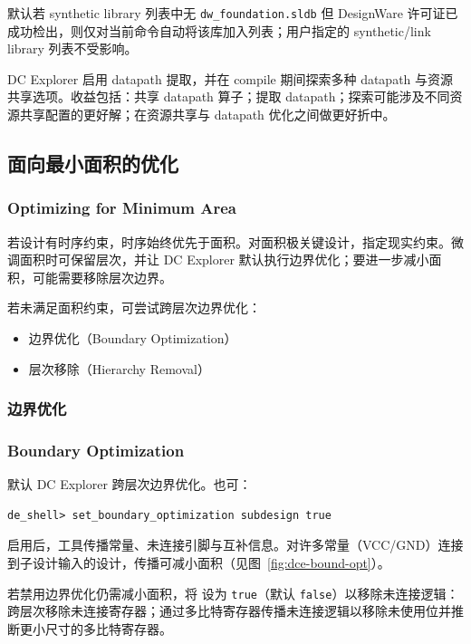 默认若 synthetic library 列表中无 \texttt{dw\_foundation.sldb} 但 DesignWare 许可证已成功检出，则仅对当前命令自动将该库加入列表；用户指定的 synthetic/link library 列表不受影响。

DC Explorer 启用 datapath 提取，并在 compile 期间探索多种 datapath 与资源共享选项。收益包括：共享 datapath 算子；提取 datapath；探索可能涉及不同资源共享配置的更好解；在资源共享与 datapath 优化之间做更好折中。

\subsection{面向最小面积的优化}
\subsubsection*{Optimizing for Minimum Area}

若设计有时序约束，时序始终优先于面积。对面积极关键设计，指定现实约束。微调面积时可保留层次，并让 DC Explorer 默认执行边界优化；要进一步减小面积，可能需要移除层次边界。

若未满足面积约束，可尝试跨层次边界优化：
\begin{itemize}
  \item 边界优化（Boundary Optimization）
  \item 层次移除（Hierarchy Removal）
\end{itemize}

\subsubsection{边界优化}
\subsubsection*{Boundary Optimization}

默认 DC Explorer 跨层次边界优化。也可：
\begin{lstlisting}
de_shell> set_boundary_optimization subdesign true
\end{lstlisting}

启用后，工具传播常量、未连接引脚与互补信息。对许多常量（VCC/GND）连接到子设计输入的设计，传播可减小面积（见图~\ref{fig:dce-bound-opt}）。


若禁用边界优化仍需减小面积，将  设为 \texttt{true}（默认 \texttt{false}）以移除未连接逻辑：跨层次移除未连接寄存器；通过多比特寄存器传播未连接逻辑以移除未使用位并推断更小尺寸的多比特寄存器。

